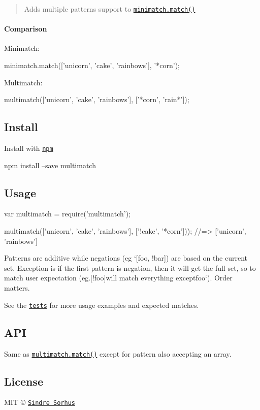 \begin{quote}
Adds multiple patterns support to \href{https://github.com/isaacs/minimatch#minimatchmatchlist-pattern-options}{\tt {\ttfamily minimatch.\+match()}} \end{quote}


\paragraph*{Comparison}

Minimatch\+:


\begin{DoxyCode}
minimatch.match(['unicorn', 'cake', 'rainbows'], '*corn');
\end{DoxyCode}


Multimatch\+:


\begin{DoxyCode}
multimatch(['unicorn', 'cake', 'rainbows'], ['*corn', 'rain*']);
\end{DoxyCode}


\subsection*{Install}

Install with \href{https://npmjs.org/package/multimatch}{\tt npm}


\begin{DoxyCode}
npm install --save multimatch
\end{DoxyCode}


\subsection*{Usage}


\begin{DoxyCode}
var multimatch = require('multimatch');

multimatch(['unicorn', 'cake', 'rainbows'], ['!cake', '*corn']));
//=> ['unicorn', 'rainbows']
\end{DoxyCode}


Patterns are additive while negations (eg `\mbox{[}\textquotesingle{}foo\textquotesingle{}, \textquotesingle{}!bar\textquotesingle{}\mbox{]}{\ttfamily ) are based on the current set. Exception is if the first pattern is negation, then it will get the full set, so to match user expectation (eg.}\mbox{[}\textquotesingle{}!foo\textquotesingle{}\mbox{]}{\ttfamily will match everything except}foo`). Order matters.

See the \href{https://github.com/sindresorhus/multimatch/blob/master/test.js}{\tt tests} for more usage examples and expected matches.

\subsection*{A\+PI}

Same as \href{https://github.com/isaacs/minimatch#minimatchmatchlist-pattern-options}{\tt {\ttfamily multimatch.\+match()}} except for {\ttfamily pattern} also accepting an array.

\subsection*{License}

M\+IT © \href{http://sindresorhus.com}{\tt Sindre Sorhus} 